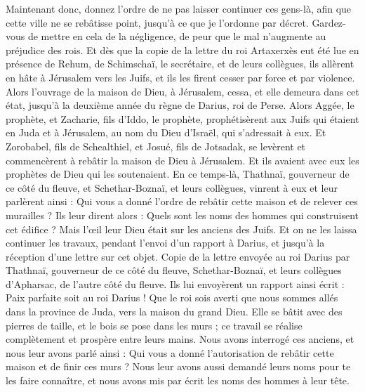 \begin{multicols}{2}
Maintenant donc, donnez l’ordre de ne pas laisser continuer ces gens-là, afin que cette ville ne se rebâtisse point, jusqu’à ce que je l'ordonne par décret.
Gardez-vous de mettre en cela de la négligence, de peur que le mal n’augmente au préjudice des rois.
Et dès que la copie de la lettre du roi Artaxerxès eut été lue en présence de Rehum, de Schimschaï, le secrétaire, et de leurs collègues, ils allèrent en hâte à Jérusalem vers les Juifs, et ils les firent cesser par force et par violence.
Alors l’ouvrage de la maison de Dieu, à Jérusalem, cessa, et elle demeura dans cet état, jusqu'à la deuxième année du règne de Darius, roi de Perse.
\VerseOne{}Alors Aggée, le prophète, et Zacharie, fils d'Iddo, le prophète, prophétisèrent aux Juifs qui étaient en Juda et à Jérusalem, au nom du Dieu d'Israël, qui s’adressait à eux.
Et Zorobabel, fils de Schealthiel, et Josué, fils de Jotsadak, se levèrent et commencèrent à rebâtir la maison de Dieu à Jérusalem. Et ils avaient avec eux les prophètes de Dieu qui les soutenaient.
En ce temps-là, Thathnaï, gouverneur de ce côté du fleuve, et Schethar-Boznaï, et leurs collègues, vinrent à eux et leur parlèrent ainsi : Qui vous a donné l’ordre de rebâtir cette maison et de relever ces murailles ?
Ils leur dirent alors : Quels sont les noms des hommes qui construisent cet édifice ?
Mais l’œil leur Dieu était sur les anciens des Juifs. Et on ne les laissa continuer les travaux, pendant l’envoi d’un rapport à Darius, et jusqu'à la réception d’une lettre sur cet objet.
Copie de la lettre envoyée au roi Darius par Thathnaï, gouverneur de ce côté du fleuve, Schethar-Boznaï, et leurs collègues d'Apharsac, de l’autre côté du fleuve.
Ils lui envoyèrent un rapport ainsi écrit : Paix parfaite soit au roi Darius !
Que le roi sois averti que nous sommes allés dans la province de Juda, vers la maison du grand Dieu. Elle se bâtit avec des pierres de taille, et le bois se pose dans les murs ; ce travail se réalise complètement et prospère entre leurs mains.
Nous avons interrogé ces anciens, et nous leur avons parlé ainsi : Qui vous a donné l'autorisation de rebâtir cette maison et de finir ces murs ?
Nous leur avons aussi demandé leurs noms pour te les faire connaître, et nous avons mis par écrit les noms des hommes à leur tête.

\end{multicols}
